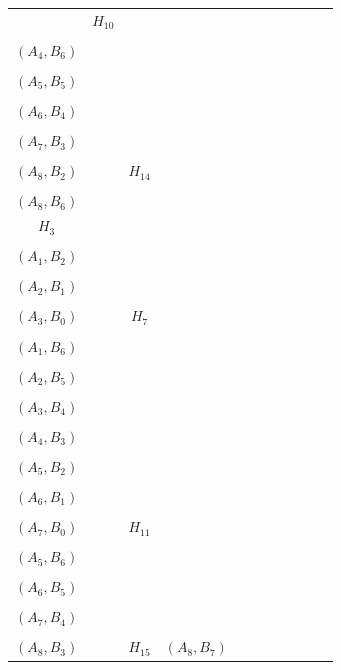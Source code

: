 \begin{enumerate}
\begin{longtable}[c]{|c|c|c|c|c|c|c|c|c|c|c|}
		&
		$H_{10}$ &
		\begin{tabular}[c]{@{}c@{}}$(A_3, B_7)$\\ \\ $(A_4, B_6)$\\ \\ $(A_5, B_5)$\\ \\ $(A_6, B_4)$\\ \\ $(A_7, B_3)$\\ \\ $(A_8, B_2)$\end{tabular} &
		&
		$H_{14}$ &
		\begin{tabular}[c]{@{}c@{}}$(A_7, B_7)$\\ \\ $(A_8, B_6)$\end{tabular} \\ \cline{1-2} \cline{4-5} \cline{7-8} \cline{10-11} 
		$H_3$ &
		\begin{tabular}[c]{@{}c@{}}$(A_0, B_3)$\\ \\ $(A_1, B_2)$\\ \\ $(A_2, B_1)$\\ \\ $(A_3, B_0)$\end{tabular} &
		&
		$H_7$ &
		\begin{tabular}[c]{@{}c@{}}$(A_0, B_7)$\\ \\ $(A_1, B_6)$\\ \\ $(A_2, B_5)$\\ \\ $(A_3, B_4)$\\ \\ $(A_4, B_3)$\\ \\ $(A_5, B_2)$\\ \\ $(A_6, B_1)$\\ \\ $(A_7, B_0)$\end{tabular} &
		&
		$H_{11}$ &
		\begin{tabular}[c]{@{}c@{}}$(A_4, B_7)$\\ \\ $(A_5, B_6)$\\ \\ $(A_6, B_5)$\\ \\ $(A_7, B_4)$\\ \\ $(A_8, B_3)$\end{tabular} &
		&
		$H_{15}$ &
		$(A_8, B_7)$ \\ \cline{1-2} \cline{4-5} \cline{7-8} \cline{10-11} 
	\end{longtable}


\end{enumerate}
